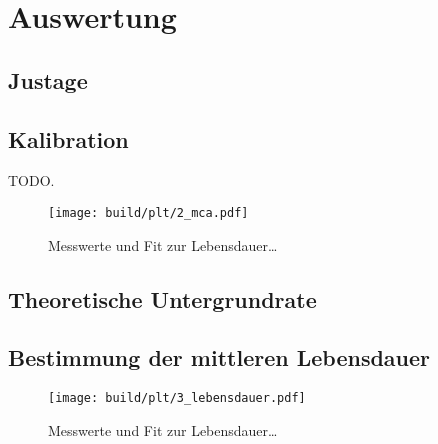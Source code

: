\section{Auswertung}
\label{sec:auswertung}

\subsection{Justage}


\subsection{Kalibration}
\begin{table}
    \centering
    \caption{TODO.}
    \label{tab:2_mca}
\end{table}

\begin{figure}
    \centering
    \texttt{[image: build/plt/2\_mca.pdf]}
    \caption{Messwerte und Fit zur Lebensdauer…}
    \label{fig:plt:2_mca}
\end{figure}


\subsection{Theoretische Untergrundrate}


\subsection{Bestimmung der mittleren Lebensdauer}
\begin{figure}
    \centering
    \texttt{[image: build/plt/3\_lebensdauer.pdf]}
    \caption{Messwerte und Fit zur Lebensdauer…}
    \label{fig:plt:3_lebensdauer}
\end{figure}
